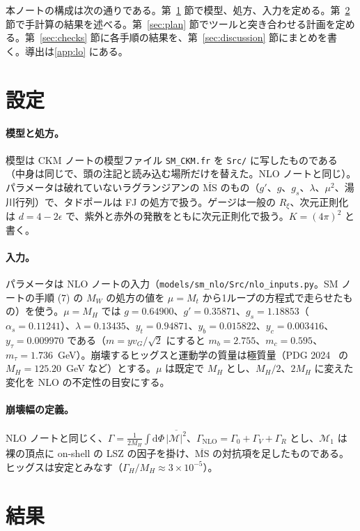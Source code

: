\documentclass[a4paper,10pt]{ltjsarticle}
\newcommand{\dd}{\mathrm{d}}
\newcommand{\MSbar}{\overline{\mathrm{MS}}}
\begin{document}
本ノートの構成は次の通りである。第~\ref{sec:setup} 節で模型、処方、入力を定める。第~\ref{sec:results} 節で手計算の結果を述べる。第~\ref{sec:plan} 節でツールと突き合わせる計画を定める。第~\ref{sec:checks} 節に各手順の結果を、第~\ref{sec:discussion} 節にまとめを書く。導出は\ref{app:lo} にある。

\section{設定}\label{sec:setup}

\paragraph{模型と処方。}模型は CKM ノートの模型ファイル \texttt{SM\_CKM.fr} を \texttt{Src/} に写したものである（中身は同じで、頭の注記と読み込む場所だけを替えた。NLO ノートと同じ）。パラメータは破れていないラグランジアンの $\MSbar$ のもの（$g'$、$g$、$g_s$、$\lambda$、$\mu^2$、湯川行列）で、タドポールは FJ の処方で扱う。ゲージは一般の $R_\xi$、次元正則化は $d=4-2\epsilon$ で、紫外と赤外の発散をともに次元正則化で扱う。$K=(4\pi)^2$ と書く。

\paragraph{入力。}パラメータは NLO ノートの入力（\texttt{models/sm\_nlo/Src/nlo\_inputs.py}。SM ノートの手順 (7) の $M_W$ の処方の値を $\mu=M_t$ から1ループの方程式で走らせたもの）を使う。$\mu=M_H$ では $g=0.64900$、$g'=0.35871$、$g_s=1.18853$（$\alpha_s=0.11241$）、$\lambda=0.13435$、$y_t=0.94871$、$y_b=0.015822$、$y_c=0.003416$、$y_\tau=0.009970$ である（$m=yv_G/\sqrt2$ にすると $m_b=2.755$、$m_c=0.595$、$m_\tau=1.736$~GeV）。崩壊するヒッグスと運動学の質量は極質量（PDG 2024~\cite{pdg24} の $M_H=125.20$~GeV など）とする。$\mu$ は既定で $M_H$ とし、$M_H/2$、$2M_H$ に変えた変化を NLO の不定性の目安にする。

\paragraph{崩壊幅の定義。}NLO ノートと同じく、$\Gamma=\frac1{2M_H}\int\dd\Phi\,\overline{|\mathcal M|^2}$、$\Gamma_{\mathrm{NLO}}=\Gamma_0+\Gamma_V+\Gamma_R$ とし、$\mathcal M_1$ は裸の頂点に on-shell の LSZ の因子を掛け、$\MSbar$ の対抗項を足したものである。ヒッグスは安定とみなす（$\Gamma_H/M_H\approx3\times10^{-5}$）。

\section{結果}\label{sec:results}
\end{document}
